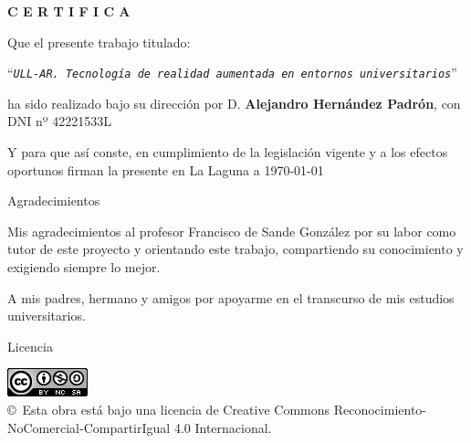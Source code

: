 \documentclass[spanish,a4paper,12pt,oneside]{extreport}
\newcommand{\BulletP}{\texttt{ULL-AR.{ Tecnología de realidad aumentada en entornos universitarios}}}
\begin{document}
\bigskip

\bigskip
\bigskip
{\bf C E R T I F I C A}

\bigskip
\bigskip
\bigskip
Que el presente trabajo titulado:

\bigskip
``{\it \BulletP{}}''

\bigskip
\bigskip
\bigskip
\noindent ha sido realizado bajo su dirección por D. {\bf Alejandro Hernández Padrón}, con DNI nº 42221533L

\bigskip
\bigskip

Y para que así conste, en cumplimiento de la legislación vigente y a los efectos
oportunos firman la presente en La Laguna a \today

\newpage
\thispagestyle{empty}

{ \flushright

\begin{LARGE}
Agradecimientos
\end{LARGE}

\hspace{3mm}

\begin{large}


\hspace{3mm}
Mis agradecimientos al profesor Francisco de Sande González por
su labor como tutor de este proyecto y orientando este trabajo,
compartiendo su conocimiento y exigiendo siempre lo mejor.


\hspace{3mm}
A mis padres, hermano y amigos por apoyarme en el transcurso de mis 
estudios universitarios. 
\end{large}

}

\newpage

\begin{huge}
Licencia
\end{huge}

\bigskip

\begin{center}
\includegraphics[scale=1.5]{images/by-nc-sa_88x31}\\[10mm]
{\Large \copyright~Esta obra está bajo una licencia de Creative Commons Reconocimiento-NoComercial-CompartirIgual 4.0 Internacional.
}
\end{center}
\end{document}
